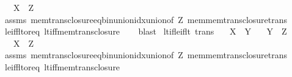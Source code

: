 \begin{isabellebody}
\ \ \ {\isachardoublequoteopen}X\ {\isacharless}{\kern0pt}\ Z{\isachardoublequoteclose}\isanewline
%
\isadelimproof
\ \ %
\endisadelimproof
%
\isatagproof
{}\isamarkupfalse%
\ assms\ mem{\isacharunderscore}{\kern0pt}trans{\isacharunderscore}{\kern0pt}closure{\isacharunderscore}{\kern0pt}eq{\isacharunderscore}{\kern0pt}bin{\isacharunderscore}{\kern0pt}union{\isacharunderscore}{\kern0pt}idx{\isacharunderscore}{\kern0pt}union{\isacharbrackleft}{\kern0pt}of\ Z{\isacharbrackright}{\kern0pt}\ mem{\isacharunderscore}{\kern0pt}mem{\isacharunderscore}{\kern0pt}trans{\isacharunderscore}{\kern0pt}closure{\isacharunderscore}{\kern0pt}trans\isanewline
\ \ \isamarkupfalse%
\ le{\isacharunderscore}{\kern0pt}iff{\isacharunderscore}{\kern0pt}lt{\isacharunderscore}{\kern0pt}or{\isacharunderscore}{\kern0pt}eq\ lt{\isacharunderscore}{\kern0pt}iff{\isacharunderscore}{\kern0pt}mem{\isacharunderscore}{\kern0pt}trans{\isacharunderscore}{\kern0pt}closure\isanewline
\ \ \isamarkupfalse%
\ blast%
\endisatagproof
{\isafoldproof}%
%
\isadelimproof
\isanewline
%
\endisadelimproof
\isanewline
{}\isamarkupfalse%
\ lt{\isacharunderscore}{\kern0pt}if{\isacharunderscore}{\kern0pt}le{\isacharunderscore}{\kern0pt}if{\isacharunderscore}{\kern0pt}lt\ {\isacharbrackleft}{\kern0pt}trans{\isacharbrackright}{\kern0pt}{\isacharcolon}{\kern0pt}\isanewline
\ \ \ {\isachardoublequoteopen}X\ {\isacharless}{\kern0pt}\ Y{\isachardoublequoteclose}\isanewline
\ \ \ {\isachardoublequoteopen}Y\ {\isasymle}\ Z{\isachardoublequoteclose}\isanewline
\ \ \ {\isachardoublequoteopen}X\ {\isacharless}{\kern0pt}\ Z{\isachardoublequoteclose}\isanewline
%
\isadelimproof
\ \ %
\endisadelimproof
%
\isatagproof
{}\isamarkupfalse%
\ assms\ mem{\isacharunderscore}{\kern0pt}trans{\isacharunderscore}{\kern0pt}closure{\isacharunderscore}{\kern0pt}eq{\isacharunderscore}{\kern0pt}bin{\isacharunderscore}{\kern0pt}union{\isacharunderscore}{\kern0pt}idx{\isacharunderscore}{\kern0pt}union{\isacharbrackleft}{\kern0pt}of\ Z{\isacharbrackright}{\kern0pt}\ mem{\isacharunderscore}{\kern0pt}mem{\isacharunderscore}{\kern0pt}trans{\isacharunderscore}{\kern0pt}closure{\isacharunderscore}{\kern0pt}trans\isanewline
\ \ \isamarkupfalse%
\ le{\isacharunderscore}{\kern0pt}iff{\isacharunderscore}{\kern0pt}lt{\isacharunderscore}{\kern0pt}or{\isacharunderscore}{\kern0pt}eq\ lt{\isacharunderscore}{\kern0pt}iff{\isacharunderscore}{\kern0pt}mem{\isacharunderscore}{\kern0pt}trans{\isacharunderscore}{\kern0pt}closure\isanewline

\end{isabellebody}
